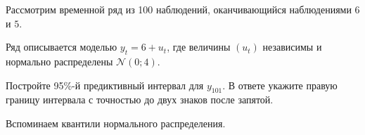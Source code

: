 
\begin{question}
Рассмотрим временной ряд из 100 наблюдений, оканчивающийся наблюдениями \(6\) и \(5\).

Ряд описывается моделью \(y_t = 6 + u_t\), где величины \((u_t)\) независимы
и нормально распределены \(\mathcal{N}(0; 4)\).

Постройте 95\%-й предиктивный интервал для \(y_{101}\).
В ответе укажите правую границу интервала с точностью до двух знаков после запятой.
\end{question}

\begin{solution}
Вспоминаем квантили нормального распределения.
\end{solution}

